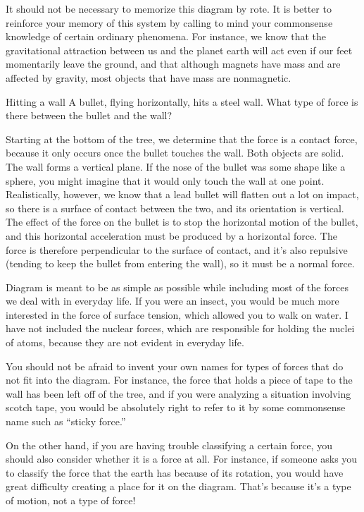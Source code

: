 It should not be necessary to memorize this diagram by rote.
It is better to reinforce your memory of this system by
calling to mind your commonsense knowledge of certain
ordinary phenomena. For instance, we know that the
gravitational attraction between us and the planet earth
will act even if our feet momentarily leave the ground, and
that although magnets have mass and are affected by gravity,
most objects that have mass are nonmagnetic.

\begin{eg}{Hitting a wall}
\egquestion A bullet, flying horizontally, hits a steel wall. What type
of force is there between the bullet and the wall?

\eganswer Starting at the bottom of the tree, we determine that the
force is a contact force, because it only occurs once the bullet touches
the wall. Both objects are solid. The wall forms a vertical
plane. If the nose of the bullet was some shape like a sphere, you might
imagine that it would only touch the
wall at one point. Realistically, however, we know that a lead bullet will flatten out
a lot on impact, so there is a surface of contact between the
two, and its orientation is vertical. The effect of the force on the bullet is to stop the
horizontal motion of the bullet, and this horizontal acceleration must be produced
by a horizontal force. The force is therefore perpendicular to the surface of contact,
and it's also repulsive (tending to keep the bullet from entering the wall), so it must be
a normal force.
\end{eg}

Diagram  is meant to be as simple as possible while
including most of the forces we deal with in everyday life.
If you were an insect, you would be much more interested in
the force of surface tension, which allowed you to walk on
water. I have not included the nuclear forces, which are
responsible for holding the nuclei of atoms, because they
are not evident in everyday life.

You should not be afraid to invent your own names for types
of forces that do not fit into the diagram. For instance,
the force that holds a piece of tape to the wall has been
left off of the tree, and if you were analyzing a situation
involving scotch tape, you would be absolutely right to
refer to it by some commonsense name such as ``sticky force.''

On the other hand, if you are having trouble classifying a
certain force, you should also consider whether it is a
force at all. For instance, if someone asks you to classify
the force that the earth has because of its rotation, you
would have great difficulty creating a place for it  on the
diagram. That's because it's a type of motion, not a type of force!

